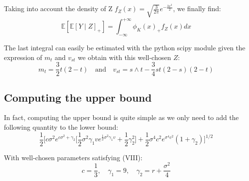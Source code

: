 \documentclass{article}
\begin{document}
Taking into account the density of Z $f_Z(x)=\sqrt{\frac{3}{2\pi}} e^{-\frac{3x^2}{2}}$, we finally find:
\begin{equation}
	\mathbb{E}[\mathbb{E}[Y\mid Z]_{+}]=\int_{-\infty}^{+\infty}\phi_{K}(x)_{+}f_Z(x)dx
	\tag{IX}
\end{equation}

The last integral can easily be estimated with the python scipy module given the expression of
$m_t$ and $v_{st}$ we obtain with this well-chosen $Z$:
\[
	m_t = \frac{3}{2} t (2-t) \quad \text{and} \quad v_{st} = s \wedge t - \frac{3}{4} st (2-s)(2-t)
\]

\subsection{Computing the upper bound}

In fact, computing the upper bound is quite simple as we only need to add
the following quantity to the lower bound:
\[
	\frac{1}{2}\Biggl[c\sigma^{2}e^{c\sigma^{2}+\gamma_{2}}\biggl[\frac{1}{2}\sigma^{2}\gamma_{1}v e^{{\frac{1}{2}}
	\sigma^{2}\gamma_{1}v}+{\textstyle{\frac{1}{2}}}\gamma_{2}^{2}\biggr]+{\textstyle{\frac{1}{2}}}\sigma^{4}c^{2}
	e^{\sigma^{4}c^{2}}(1+\gamma_{2})\Biggr]^{1/2}
\]

With well-chosen parameters satisfying (VIII):
\[
    c=\frac{1}{3}, \quad
    \gamma_{1}=9, \quad
    \gamma_{2}=r+\frac{\sigma^{2}}{4} 
\]
\end{document}
